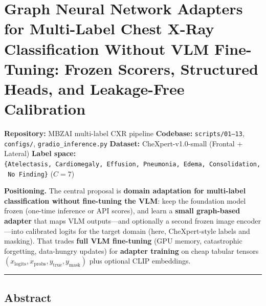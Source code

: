 \documentclass[
  11pt,
]{article}
\author{}
\date{}
\begin{document}
\section{Graph Neural Network Adapters for Multi-Label Chest X-Ray
Classification Without VLM Fine-Tuning: Frozen Scorers, Structured
Heads, and Leakage-Free
Calibration}\label{graph-neural-network-adapters-for-multi-label-chest-x-ray-classification-without-vlm-fine-tuning-frozen-scorers-structured-heads-and-leakage-free-calibration}

\textbf{Repository:} MBZAI multi-label CXR pipeline \textbf{Codebase:}
\texttt{scripts/01–13}, \texttt{configs/}, \texttt{gradio\_inference.py}
\textbf{Dataset:} CheXpert-v1.0-small (Frontal + Lateral) \textbf{Label
space:}
\texttt{\{Atelectasis,\ Cardiomegaly,\ Effusion,\ Pneumonia,\ Edema,\ Consolidation,\ No\ Finding\}}
(\(C=7\))

\textbf{Positioning.} The central proposal is \textbf{domain adaptation
for multi-label classification without fine-tuning the VLM}: keep the
foundation model frozen (one-time inference or API scores), and learn a
\textbf{small graph-based adapter} that maps VLM outputs---and
optionally a second frozen image encoder---into calibrated logits for
the target domain (here, CheXpert-style labels and masking). That trades
\textbf{full VLM fine-tuning} (GPU memory, catastrophic forgetting,
data-hungry updates) for \textbf{adapter training} on cheap tabular
tensors
\((x_{\text{logits}}, x_{\text{probs}}, y_{\text{true}}, y_{\text{mask}})\)
plus optional CLIP embeddings.

\begin{center}\rule{0.5\linewidth}{0.5pt}\end{center}

\subsection{Abstract}\label{abstract}
\end{document}
